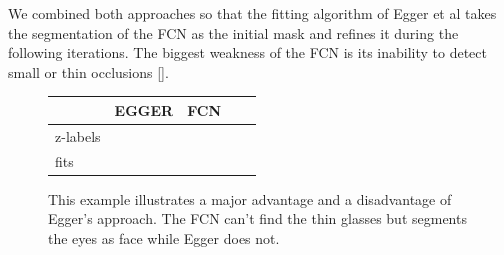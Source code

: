 We combined both approaches so that the fitting algorithm of Egger et al takes the segmentation of the FCN as the initial mask and refines it during the following iterations. The biggest weakness of the FCN is its inability to detect small or thin occlusions []. 

\begin{figure}
\begin{center}
\begin{tabular}{m{1.3cm}|SC|SC}
	& EGGER & FCN \\ \hline
	z-labels &  &
	\\ \hline
	fits &  & 
	 \\
\end{tabular}
\caption{This example illustrates a major advantage and a disadvantage of Egger's approach. The FCN can't find the thin glasses but segments the eyes as face while Egger does not.}
\label{fig:chap4:harry}
\end{center}
\end{figure}

